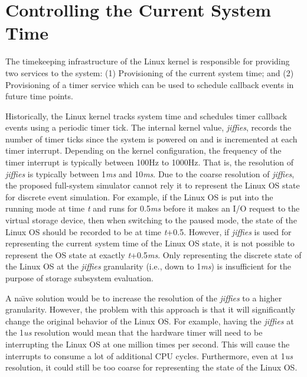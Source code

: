 \section{Controlling the Current System Time}
\label{sec:controlling-current-system-time}

The timekeeping infrastructure of the Linux kernel is responsible for providing two services to the system: (1) Provisioning of the current system time; and (2) Provisioning of a timer service which can be used to schedule callback events in future time points.

Historically, the Linux kernel tracks system time and schedules timer callback events using a periodic timer tick. The internal kernel value, \textit{jiffies}, records the number of timer ticks since the system is powered on and is incremented at each timer interrupt. Depending on the kernel configuration, the frequency of the timer interrupt is typically between 100Hz to 1000Hz. That is, the resolution of \textit{jiffies} is typically between 1\textit{ms} and 10\textit{ms}. Due to the coarse resolution of \textit{jiffies}, the proposed full-system simulator cannot rely it to represent the Linux OS state for discrete event simulation. For example, if the Linux OS is put into the running mode at time \textit{t} and runs for 0.5\textit{ms} before it makes an I/O request to the virtual storage device, then when switching to the paused mode, the state of the Linux OS should be recorded to be at time \textit{t}+0.5\millisecond. However, if \textit{jiffies} is used for representing the current system time of the Linux OS state, it is not possible to represent the OS state at exactly \textit{t}+0.5\textit{ms}. Only representing the discrete state of the Linux OS at the \textit{jiffies} granularity (i.e., down to 1\textit{ms}) is insufficient for the purpose of storage subsystem evaluation.

A na\"{\i}ve solution would be to increase the resolution of the \textit{jiffies} to a higher granularity. However, the problem with this approach is that it will significantly change the original behavior of the Linux OS. For example, having the \textit{jiffies} at the 1\textit{us} resolution would mean that the hardware timer will need to be interrupting the Linux OS at one million times per second. This will cause the interrupts to consume a lot of additional CPU cycles. Furthermore, even at 1\textit{us} resolution, it could still be too coarse for representing the state of the Linux OS.

